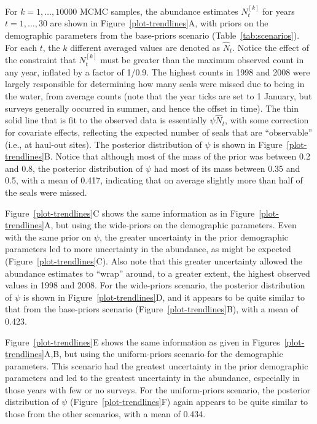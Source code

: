 \documentclass[]{risa}\usepackage[]{graphicx}\usepackage[]{color}
\begin{document}
For $k = 1,\ldots,10000$ MCMC samples, the abundance estimates $N_t^{[k]}$ for years $t = 1,\ldots,30$ are shown in Figure~\ref{plot-trendlines}A, with priors on the demographic parameters from the base-priors scenario (Table~\ref{tab:scenarios}). For each $t$, the $k$ different averaged values are denoted as $\hat{N}_t$.  Notice the effect of the constraint that $N_t^{[k]}$ must be greater than the maximum observed count in any year, inflated by a factor of 1/0.9. The highest counts in 1998 and 2008 were largely responsible for determining how many seals were missed due to being in the water, from average counts (note that the year ticks are set to 1 January, but surveys generally occurred in summer, and hence the offset in time).  The thin solid line that is fit to the observed data is essentially $\psi \hat{N}_t$, with some correction for covariate effects, reflecting the expected number of seals that are ``observable'' (i.e., at haul-out sites).  The posterior distribution of $\psi$ is shown in Figure~\ref{plot-trendlines}B. Notice that although most of the mass of the prior was between 0.2 and 0.8, the posterior distribution of $\psi$ had most of its mass between 0.35 and 0.5, with a mean of 0.417, indicating that on average slightly more than half of the seals were missed.



Figure~\ref{plot-trendlines}C shows the same information as in Figure~\ref{plot-trendlines}A, but using the wide-priors on the demographic parameters.  Even with the same prior on $\psi$, the greater uncertainty in the prior demographic parameters led to more uncertainty in the abundance, as might be expected (Figure~\ref{plot-trendlines}C). Also note that this greater uncertainty allowed the abundance estimates to ``wrap'' around, to a greater extent, the highest observed values in 1998 and 2008. For the wide-priors scenario, the posterior distribution of $\psi$ is shown in Figure~\ref{plot-trendlines}D, and it appears to be quite similar to that from the base-priors scenario (Figure~\ref{plot-trendlines}B), with a mean of 0.423.

Figure~\ref{plot-trendlines}E shows the same information as given in Figures~\ref{plot-trendlines}A,B, but using the uniform-priors scenario for the demographic parameters.  This scenario had the greatest uncertainty in the prior demographic parameters and led to the greatest uncertainty in the abundance, especially in those years with few or no surveys. For the uniform-priors scenario, the posterior distribution of $\psi$ (Figure~\ref{plot-trendlines}F) again appears to be quite similar to those from the other scenarios, with a mean of 0.434.
\end{document}
